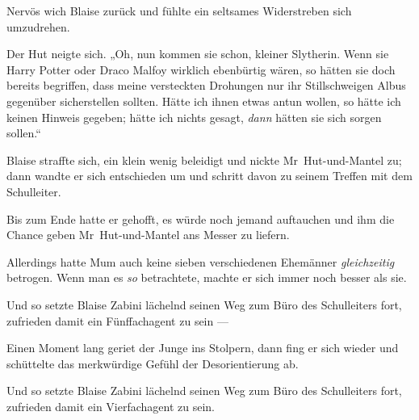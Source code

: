 Nervös wich Blaise zurück und fühlte ein seltsames Widerstreben sich umzudrehen.

Der Hut neigte sich.
„Oh, nun kommen sie schon, kleiner Slytherin. Wenn sie Harry Potter oder Draco Malfoy wirklich ebenbürtig wären, so hätten sie doch bereits begriffen, dass meine versteckten Drohungen nur ihr Stillschweigen Albus gegenüber sicherstellen sollten. Hätte ich ihnen etwas antun wollen, so hätte ich keinen Hinweis gegeben; hätte ich nichts gesagt, \emph{dann} hätten sie sich sorgen sollen.“

Blaise straffte sich, ein klein wenig beleidigt und nickte Mr~Hut-und-Mantel zu; dann wandte er sich entschieden um und schritt davon zu seinem Treffen mit dem Schulleiter.

Bis zum Ende hatte er gehofft, es würde noch jemand auftauchen und ihm die Chance geben Mr~Hut-und-Mantel ans Messer zu liefern.

Allerdings hatte Mum auch keine sieben verschiedenen Ehemänner \emph{gleichzeitig} betrogen. Wenn man es \emph{so} betrachtete, machte er sich immer noch besser als sie.

Und so setzte Blaise Zabini lächelnd seinen Weg zum Büro des Schulleiters fort, zufrieden damit ein Fünffachagent zu sein —

Einen Moment lang geriet der Junge ins Stolpern, dann fing er sich wieder und schüttelte das merkwürdige Gefühl der Desorientierung ab.

Und so setzte Blaise Zabini lächelnd seinen Weg zum Büro des Schulleiters fort, zufrieden damit ein Vierfachagent zu sein.

